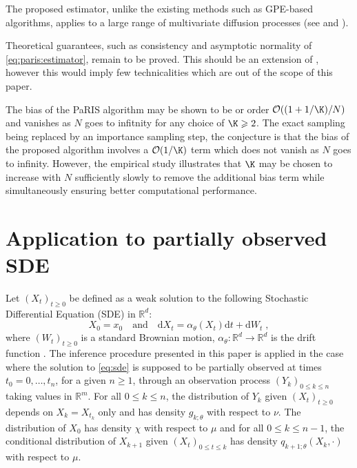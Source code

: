 \documentclass{article}
\def\dimX{d}
\def\Xset{\mathbb{R}^d}
\newcommand{\md}[1]{g_{#1}}
\newcommand{\parvec}{\theta}
\newcommand{\hd}[1]{q_{#1}}
\newcommand{\N}{N}
\newcommand{\rmd}{\ensuremath{\mathrm{d}}}
\newcommand{\eqsp}{\;}
\begin{document}
The proposed estimator, unlike the existing methods such as GPE-based algorithms, applies to a large range of multivariate diffusion processes (see \cite{andersson2017unbiased} and \cite{fearnhead2017continuous}).

Theoretical guarantees, such as consistency and asymptotic normality of \eqref{eq:paris:estimator}, remain to be proved. 
This should be an extension of \cite{gloaguen2019pseudo}, however this would imply few technicalities which are out of the scope of this paper.

The bias of the PaRIS algorithm may be shown to be or order $\mathcal{O}((1 + 1/\K)/\N)$ and vanishes as $\N$ goes to infitnity for any choice of $\K\geqslant 2$. 
The exact sampling being replaced by an importance sampling step, the conjecture is that  the bias of the proposed algorithm involves a $\mathcal{O}(1/\K)$ term which does not vanish as $\N$ goes to infinity. 
However, the empirical study illustrates that $\K$ may be chosen to increase with $\N$ sufficiently slowly to remove the additional bias term while simultaneously ensuring better computational performance. %




\appendix 

\section{Application to partially observed SDE}
\label{sec:filter:SDE}
Let $(X_t)_{t\ge 0}$ be defined as a weak solution to the following Stochastic Differential Equation (SDE) in $\mathbb{R}^d$:
\begin{equation}
\label{eq:sde}
X_0 = x_0 \quad\mbox{and}\quad \rmd X_t = \alpha_{\parvec}(X_t)\rmd t + \rmd W_t\eqsp,
\end{equation}
where $(W_t)_{t\geqslant 0}$ is a standard Brownian motion, $\alpha_{\parvec}: \Xset\to\Xset$ is the drift function
. The inference procedure presented in this paper is applied in the case where the solution to \eqref{eq:sde} is supposed to be partially observed at times $t_0 = 0,\ldots,t_n$, for a given $n\geqslant 1$, through an observation process $(Y_k)_{0\leqslant k \leqslant n}$ taking values in $\mathbb{R}^m$. For all $0\leqslant k \leqslant n$, the distribution of $Y_k$ given $(X_t)_{t\geqslant 0}$ depends on $X_k = X_{t_k}$ only and has density $\md{k;\parvec}$ with respect to $\nu$. The distribution of $X_0$ has density $\chi$ with respect to $\mu$ and for all $0\leqslant k \leqslant n-1$, the conditional distribution of $X_{k+1} $ given $(X_{t})_{0\leqslant t\leqslant k}$ has density $\hd{k+1;\parvec}(X_{k},\cdot)$ with respect to $\mu$. 
\end{document}
